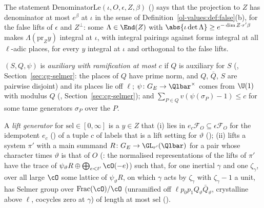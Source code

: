 The statement $\mathrm{DenominatorLe}(\iota,O,\epsilon,Z,\beta)$ ()
says that the projection to $Z$ has denominator at most $e^\beta$ at $\iota$ in the sense of
Definition~\ref{ol-values:def:false}(b), for the false lifts of $\epsilon$ and $Z^\perp$: some
$\Lambda\in\End(Z)$ with $\abs{\iota\det\Lambda}\ge e^{-\dim Z\cdot r'\beta}$ makes
$\Lambda(\mathrm{pr}_Zy)$ integral at $\iota$, with integral pairings against forms integral at all
$\ell$-adic places, for every $y$ integral at $\iota$ and orthogonal to the false lifts.

\begin{definition}\label{cg-first:def:aux}
$(S,Q,\psi)$ is \emph{auxiliary with ramification at most $c$} if $Q$ is auxiliary for $S$
(, Section~\ref{sec:cg-selmer}: the places of $Q$ have prime norm, and $Q$,
$\bar Q$, $S$ are pairwise disjoint) and its places lie off $\ell$; $\psi\colon G_E\to\Qlbar^\times$
comes from $\U(1)$ with modulus $Q$ (, Section~\ref{sec:cg-selmer}); and
$\sum_{P\in Q}v(\psi(\sigma_P)-1)\le c$ for some tame generators $\sigma_P$ over the $P$.
\end{definition}

\begin{definition}\label{cg-first:def:liftgen}
A \emph{lift generator} for $\mathrm{sel}\in[0,\infty]$ is a $y\in Z$ that (i) lies in $e_c\mathcal F_O
\subseteq\epsilon\mathcal F_O$ for the idempotent $e_c$ () of a tuple
$c$ of labels that is a lift setting for $\vartheta$ (); (ii) lifts a
system $\pi'$ with a main summand $R\colon G_E\to\GL_{r'}(\Qlbar)$ for a pair whose character times
$\vartheta$ is that of $O$ (: the normalised representations of the lifts
of $\pi'$ have the trace of $\psi_\vartheta R\oplus\bigoplus_{e<t'}\cO(-e)$) such that, for one inertial $\gamma$ and one $\zeta_\gamma$, over
all large $\cO$ some lattice of $\psi_\vartheta R$, on which $\gamma$ acts by $\zeta_\gamma$ with $\zeta_\gamma-1$ a unit,
has Selmer group over $\mathrm{Frac}(\cO)/\cO$ (unramified off $\ell p_0p_1Q_\vartheta\bar Q_\vartheta$,
crystalline above $\ell$, cocycles zero at $\gamma$) of length at most $\mathrm{sel}$
().
\end{definition}

